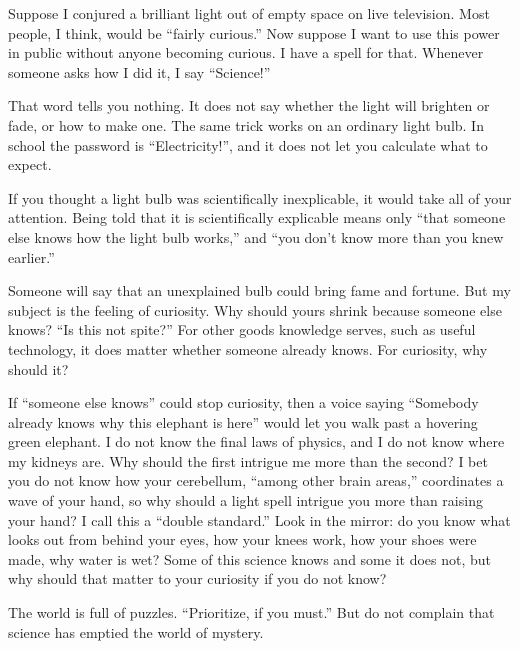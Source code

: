 
Suppose I conjured a brilliant light out of empty space on live television. Most people, I think, would be ``fairly curious.'' Now suppose I want to use this power in public without anyone becoming curious. I have a spell for that. Whenever someone asks how I did it, I say ``Science!''

That word tells you nothing. It does not say whether the light will brighten or fade, or how to make one. The same trick works on an ordinary light bulb. In school the password is ``Electricity!'', and it does not let you calculate what to expect. 

If you thought a light bulb was scientifically inexplicable, it would take all of your attention. Being told that it is scientifically explicable means only ``that someone else knows how the light bulb works,'' and ``you don't know more than you knew earlier.'' 

Someone will say that an unexplained bulb could bring fame and fortune. But my subject is the feeling of curiosity. Why should yours shrink because someone else knows? ``Is this not spite?'' For other goods knowledge serves, such as useful technology, it does matter whether someone already knows. For curiosity, why should it? 

If ``someone else knows'' could stop curiosity, then a voice saying ``Somebody already knows why this elephant is here'' would let you walk past a hovering green elephant.  I do not know the final laws of physics, and I do not know where my kidneys are. Why should the first intrigue me more than the second? I bet you do not know how your cerebellum, ``among other brain areas,'' coordinates a wave of your hand, so why should a light spell intrigue you more than raising your hand? I call this a ``double standard.'' Look in the mirror: do you know what looks out from behind your eyes, how your knees work, how your shoes were made, why water is wet? Some of this science knows and some it does not, but why should that matter to your curiosity if you do not know?

The world is full of puzzles. ``Prioritize, if you must.'' But do not complain that science has emptied the world of mystery. 

